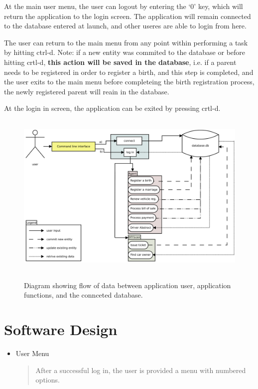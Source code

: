 \documentclass[10pt, a4paper]{article}
\begin{document}
{At the main user menu, the user can logout by entering the `0' key, which will return the application to the login screen. The application will remain connected to the database entered at launch, and other useres are able to login from here.

The user can return to the main menu from any point within performing a task by hitting ctrl-d. Note: if a new entity was commited to the database or before hitting crtl-d, \textbf{this action will be saved in the database}, i.e. if a parent needs to be registered in order to register a birth, and this step is completed, and the user exits to the main menu before completeing the birth registration process, the newly registered parent will reain in the database. 

At the login in screen, the application can be exited by pressing crtl-d.

\begin{figure}[H]
\centering
\includegraphics[height=8cm]{Diagram1.pdf}\label{fig}
\caption{Diagram showing flow of data between application user, application functions, and the connceted database.}
\end{figure}

\section{Software Design}\label{SD}
\begin{itemize}

\item User Menu
	\begin{quotation}
	\noindent After a successful log in, the user is provided a menu with numbered options. 
	\end{quotation}


\end{itemize}}
\end{document}
